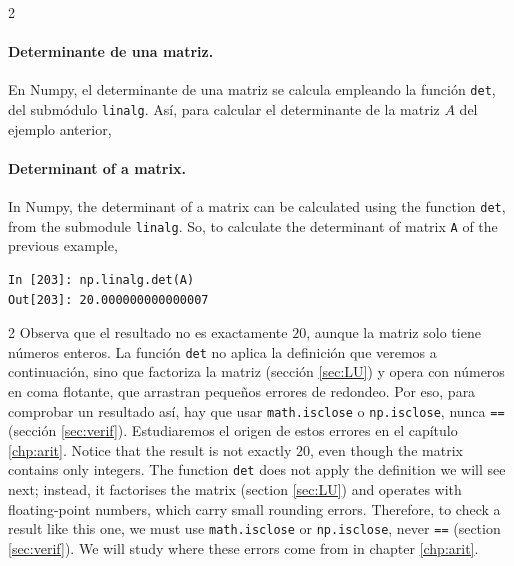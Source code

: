 \begin{paracol}{2}
\paragraph{Determinante de una matriz.} 
En Numpy, el determinante de una matriz se calcula  empleando la función \texttt{det}, del submódulo \texttt{linalg}. Así, para calcular el determinante de la matriz $A$ del ejemplo anterior,
\switchcolumn
\paragraph{Determinant of a matrix.} In Numpy, the determinant of a matrix can be calculated using the function \texttt{det}, from the submodule \texttt{linalg}. So, to calculate the determinant of matrix \texttt{A} of the previous example, 
\end{paracol}
\begin{center}
\begin{minipage}{0.5\textwidth}
\begin{verbatim}
In [203]: np.linalg.det(A)
Out[203]: 20.000000000000007
\end{verbatim}
\end{minipage}
\end{center}
\begin{paracol}{2}
Observa que el resultado no es exactamente $20$, aunque la matriz solo tiene números enteros. La función \texttt{det} no aplica la definición que veremos a continuación, sino que factoriza la matriz (sección \ref{sec:LU}) y opera con números en coma flotante, que arrastran pequeños errores de redondeo. Por eso, para comprobar un resultado así, hay que usar \texttt{math.isclose} o \texttt{np.isclose}, nunca \texttt{==} (sección \ref{sec:verif}). Estudiaremos el origen de estos errores en el capítulo \ref{chp:arit}.
\switchcolumn
Notice that the result is not exactly $20$, even though the matrix contains only integers. The function \texttt{det} does not apply the definition we will see next; instead, it factorises the matrix (section \ref{sec:LU}) and operates with floating-point numbers, which carry small rounding errors. Therefore, to check a result like this one, we must use \texttt{math.isclose} or \texttt{np.isclose}, never \texttt{==} (section \ref{sec:verif}). We will study where these errors come from in chapter \ref{chp:arit}.
\end{paracol}

